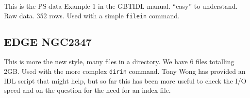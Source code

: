 \documentclass[12pt,a4paper]{article}
\begin{document}
This is the PS data Example 1 in the GBTIDL manual. ``easy'' to understand. Raw data. 352 rows.  Used with a simple {\tt filein} command.

\subsection{EDGE NGC2347}

This is more the new style, many files in a directory. We have 6 files totalling 2GB. Used with the more complex {\tt dirin} command.
Tony Wong has provided an IDL script that might help, but so far this has been more useful to check the I/O speed and on the question
for the need for an index file.
\end{document}
